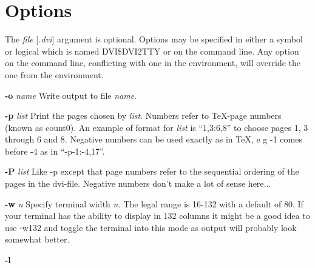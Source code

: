 \section*{Options}
The {\it file}\/ [{\it .dvi}] argument is optional.
Options may be specified in either a symbol or logical which is named
%
%
DVI\$DVI2TTY or on the command line.
Any option on the command line, conflicting with one in the
environment, will override the one from the environment.
\begin{list}{}{\setlength{\leftmargin}{0.6in}}
\item[{{\bf -o} {\it name}}]
Write output to file {\it name}.
\item[{{\bf -p} {\it list}}]
Print the pages chosen by {\it list}.
Numbers refer to \TeX-page numbers (known as \bs count0).
An example of format for {\it list}\/ is ``1,3:6,8''
to choose pages 1, 3 through 6 and 8.
Negative numbers can be used exactly as in \TeX,
e g -1 comes before -4 as in ``-p-1:-4,17''.
\item[{{\bf -P} {\it list}}]
Like -p except that page numbers refer to
the sequential ordering of the pages in the dvi-file.
Negative numbers don't make a lot of sense here...
\item[{{\bf -w} {\it n}}]
Specify terminal width {\it n.}\/ The legal range is 16-132 with a
default of 80. If your terminal has the
ability to display in 132 columns it might
be a good idea to use -w132 and toggle the
terminal into this mode as output will probably look somewhat better.
%
%
\item[{{\bf -l}}]

\end{list}
